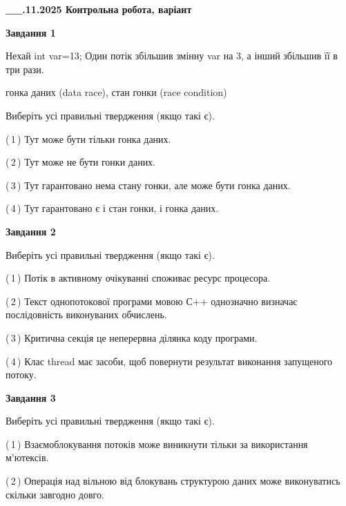 \documentclass[12pt, ukrainian]{article}
\begin{document}
\begin {large}

\textbf{\_\_.11.2025 Контрольна робота, варіант  }\par


{

\begin{center}
\textbf{Завдання 1}
\end{center}
Нехай int var=13; Один потік збільшив змінну var на 3, а інший збільшив її в три рази.

гонка даних (data race), стан гонки (race condition)

Виберіть усі правильні твердження (якщо такі є).\par
\vspace{2mm}
(\,1\,) Тут може бути тільки гонка даних.%

(\,2\,) Тут може не бути гонки даних.%

(\,3\,) Тут гарантовано нема стану гонки, але може бути гонка даних.%

(\,4\,) Тут гарантовано є і стан гонки, і гонка даних.%



\begin{center}
\textbf{Завдання 2}
\end{center}
Виберіть усі правильні твердження (якщо такі є).\par
\vspace{2mm}

(\,1\,) Потік в активному очікуванні споживає ресурс процесора.%

(\,2\,) Текст однопотокової програми мовою С++ однозначно визначає послідовність виконуваних обчислень.%

(\,3\,) Критична секція це неперервна ділянка коду програми.%

(\,4\,) Клас thread має засоби, щоб повернути результат виконання запущеного потоку.%



\begin{center}
\textbf{Завдання 3}
\end{center}
Виберіть усі правильні твердження (якщо такі є).\par
\vspace{2mm}

(\,1\,) Взаємоблокування потоків може виникнути тільки за використання м’ютексів.%

(\,2\,) Операція над вільною від блокувань структурою даних може виконуватись скільки завгодно довго.%

}
\end{large}
\end{document}
